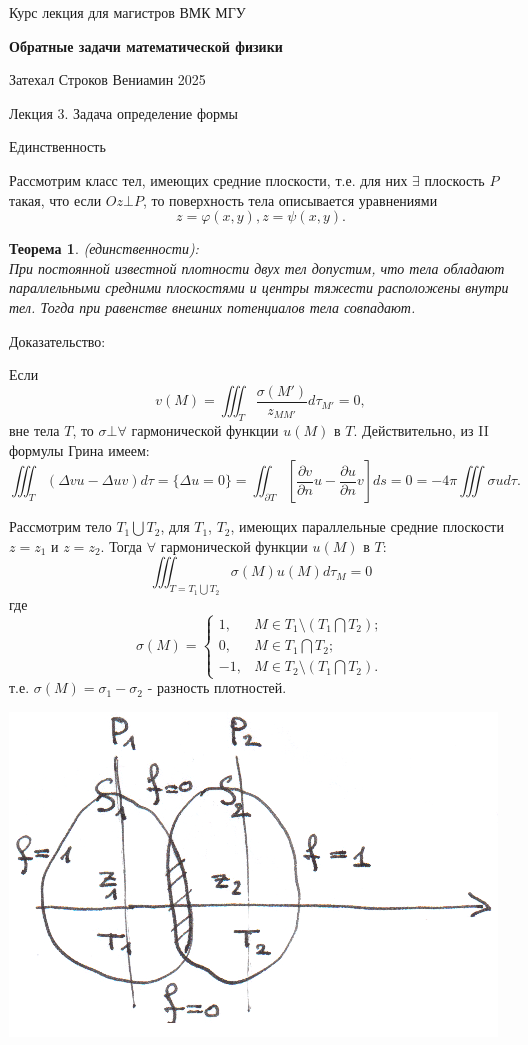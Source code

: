\documentclass{article}
\newtheorem{theorem}{Теорема}
\begin{document}
\centerline{\large Курс лекция для магистров ВМК МГУ}
\centerline {\textbf{\LARGE Обратные задачи математической физики}}
\centerline {Затехал Строков Вениамин 2025}

\vspace{0.4cm}

\centerline{\LARGE Лекция 3. Задача определение формы}

\vspace{0.5cm}
\centerline{\large Единственность}

Рассмотрим класс тел, имеющих средние плоскости, т.е. для них $\exists$ плоскость $P$ такая, что если $Oz \bot P$, то поверхность тела описывается уравнениями
\[
z = \varphi(x,y), z = \psi(x,y).
\]

\begin{theorem}
(единственности): \\
При постоянной известной плотности двух тел допустим, что тела обладают параллельными средними плоскостями и центры тяжести расположены внутри тел. Тогда при равенстве внешних потенциалов тела совпадают.
\end{theorem}
Доказательство:

Если
\[
v(M) = \iiint_T \dfrac{\sigma(M')}{z_{MM'}} d \tau_{M'} = 0,
\]
вне тела $T$, то $\sigma \bot \forall$ гармонической функции $u(M)$ в $T$. Действительно, из II формулы Грина имеем:
\[
\iiint_T (\Delta v u - \Delta u v) d \tau = \{\Delta u = 0\} = \iint_{\partial T} [\dfrac{\partial v}{\partial n} u - \dfrac{\partial u}{\partial n} v] ds = 0 = - 4 \pi \iiint \sigma u d\tau.
\]

Рассмотрим тело $T_1 \bigcup T_2$, для $T_1$, $T_2$, имеющих параллельные средние плоскости $z = z_1$ и $z = z_2$.
Тогда $\forall$ гармонической функции $u(M)$ в $T$:
\[
\iiint_{T = T_1 \bigcup T_2} \sigma (M) u(M) d\tau_M = 0 
\]
где
\[
\sigma(M) = 
	\begin{cases}
	1, & M \in T_1 \setminus (T_1 \bigcap T_2);\\
	0, & M \in T_1 \bigcap T_2;\\
	-1, &M \in T_2 \setminus (T_1 \bigcap T_2).
	\end{cases}
\]
т.е. $\sigma (M) = \sigma_1 - \sigma_2$ - разность плотностей.

\vspace{0.5cm}
\includegraphics[scale=0.85]{pic3_1.png}
\end{document}
